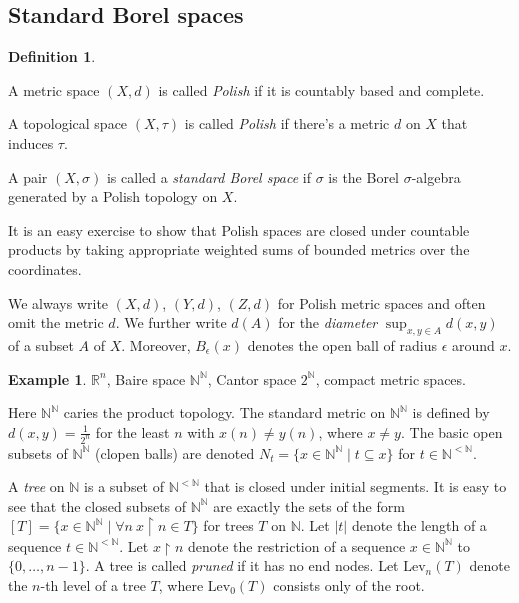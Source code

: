 \documentclass[10pt]{amsart}
\newcommand{\spl}{\mathrm{split}}
\newcommand{\RR}{\mathbb{R}}
\newcommand{\NN}{\mathbb{N}}
\newcommand{\Lev}{\mathrm{Lev}}
\theoremstyle{definition}
\newtheorem{definition}[theorem]{Definition}
\newtheorem{example}[theorem]{Example}
\theoremstyle{remark}
\newenvironment{enumerate-(a)}{\begin{enumerate}[label={\upshape (\alph*)}, leftmargin=2pc]}{\end{enumerate}}
\begin{document}
\subsection{Standard Borel spaces} 

\begin{definition} 
\begin{enumerate-(a)} 
\item 
A metric space $(X,d)$ is called \emph{Polish} if it is countably based and complete. 
\item 
A topological space $(X,\tau)$ is called \emph{Polish} if there's a metric $d$ on $X$ that induces $\tau$. 
\item 
A pair $(X,\sigma)$ is called a \emph{standard Borel space} if $\sigma$ is the Borel $\sigma$-algebra generated by a Polish topology on $X$.  
\end{enumerate-(a)} 
\end{definition} 

It is an easy exercise to show that Polish spaces are closed under countable products by taking appropriate weighted sums of bounded metrics over the coordinates. 

We always write $(X,d)$, $(Y,d)$, $(Z,d)$ for Polish metric spaces and often omit the metric $d$. 
We further write $d(A)$ for the \emph{diameter} $\sup_{x,y\in A} d(x,y)$ of a subset $A$ of $X$. 
Moreover, $B_\epsilon(x)$ denotes the open ball of radius $\epsilon$ around $x$. 

\begin{example} 
$\RR^n$, Baire space $\NN^\NN$,  Cantor space $2^\NN$, compact metric spaces. 
\end{example} 

Here $\NN^\NN$ caries the product topology. 
The standard metric on $\NN^\NN$ is defined by $d(x,y)=\frac{1}{2^n}$ for the least $n$ with $x(n)\neq y(n)$, where $x\neq y$. 
The basic open subsets of $\NN^\NN$ (clopen balls) are denoted $N_t=\{x\in \NN^\NN\mid t\subseteq x\}$ for $t\in \NN^{<\NN}$. 

A \emph{tree} on $\NN$ is a subset of $\NN^{<\NN}$ that is closed under initial segments. 
It is easy to see that the closed subsets of $\NN^\NN$ are exactly the sets of the form $[T]=\{x\in \NN^\NN\mid \forall n\ x{\upharpoonright}n \in T\}$ for trees $T$ on $\NN$. 
Let $|t|$ denote the length of a sequence $t\in \NN^{<\NN}$. 
Let $x{\upharpoonright}n$ denote the restriction of a sequence $x\in \NN^\NN$ to $\{0,\dots,n-1\}$. 
A tree is called \emph{pruned} if it has no end nodes. 
Let $\Lev_n(T)$ denote the $n$-th level of a tree $T$, where $\Lev_0(T)$ consists only of the root. 
\end{document}
